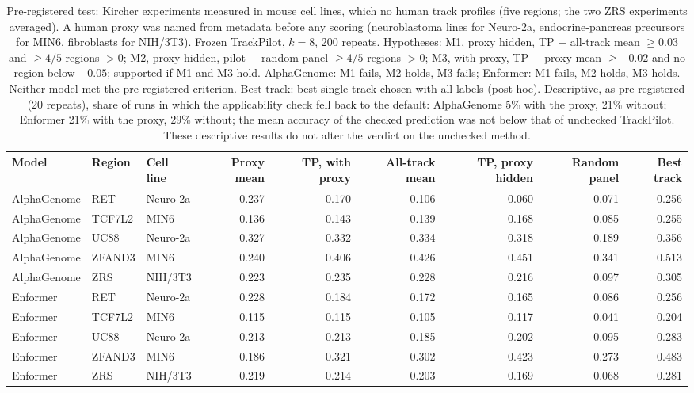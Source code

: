 \begin{table}[H]
\caption{Pre-registered test: Kircher experiments measured in mouse cell lines, which no human track profiles (five regions; the two ZRS experiments averaged). A human proxy was named from metadata before any scoring (neuroblastoma lines for Neuro-2a, endocrine-pancreas precursors for MIN6, fibroblasts for NIH/3T3). Frozen TrackPilot, $k=8$, 200 repeats. Hypotheses: M1, proxy hidden, TP $-$ all-track mean $\ge 0.03$ and $\ge 4/5$ regions $>0$; M2, proxy hidden, pilot $-$ random panel $\ge 4/5$ regions $>0$; M3, with proxy, TP $-$ proxy mean $\ge -0.02$ and no region below $-0.05$; supported if M1 and M3 hold. AlphaGenome: M1 fails, M2 holds, M3 fails; Enformer: M1 fails, M2 holds, M3 holds. Neither model met the pre-registered criterion. Best track: best single track chosen with all labels (post hoc). Descriptive, as pre-registered (20 repeats), share of runs in which the applicability check fell back to the default: AlphaGenome 5\% with the proxy, 21\% without; Enformer 21\% with the proxy, 29\% without; the mean accuracy of the checked prediction was not below that of unchecked TrackPilot. These descriptive results do not alter the verdict on the unchecked method.}\label{tab:s14}
\centering\small
\begin{tabular}{lllrrrrrr}
\toprule
Model & Region & Cell line & Proxy mean & TP, with proxy & All-track mean & TP, proxy hidden & Random panel & Best track \\
\midrule
AlphaGenome & RET & Neuro-2a & 0.237 & 0.170 & 0.106 & 0.060 & 0.071 & 0.256 \\
AlphaGenome & TCF7L2 & MIN6 & 0.136 & 0.143 & 0.139 & 0.168 & 0.085 & 0.255 \\
AlphaGenome & UC88 & Neuro-2a & 0.327 & 0.332 & 0.334 & 0.318 & 0.189 & 0.356 \\
AlphaGenome & ZFAND3 & MIN6 & 0.240 & 0.406 & 0.426 & 0.451 & 0.341 & 0.513 \\
AlphaGenome & ZRS & NIH/3T3 & 0.223 & 0.235 & 0.228 & 0.216 & 0.097 & 0.305 \\
Enformer & RET & Neuro-2a & 0.228 & 0.184 & 0.172 & 0.165 & 0.086 & 0.256 \\
Enformer & TCF7L2 & MIN6 & 0.115 & 0.115 & 0.105 & 0.117 & 0.041 & 0.204 \\
Enformer & UC88 & Neuro-2a & 0.213 & 0.213 & 0.185 & 0.202 & 0.095 & 0.283 \\
Enformer & ZFAND3 & MIN6 & 0.186 & 0.321 & 0.302 & 0.423 & 0.273 & 0.483 \\
Enformer & ZRS & NIH/3T3 & 0.219 & 0.214 & 0.203 & 0.169 & 0.068 & 0.281 \\
\bottomrule
\end{tabular}
\end{table}

